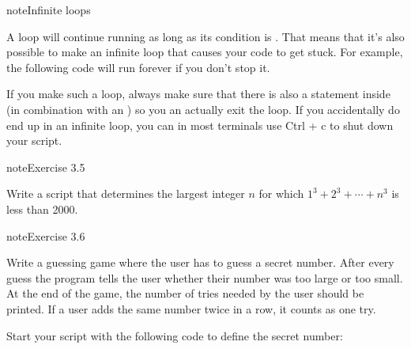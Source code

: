 \documentclass[letterpaper,10pt,english]{jupyterBook}
\begin{document}
\begin{sphinxadmonition}{note}{Infinite loops}

\sphinxAtStartPar
A  loop will continue running as long as its condition is . That means that it’s also possible to make an infinite loop that causes your code to get stuck. For example, the following code will run forever if you don’t stop it.

\begin{sphinxVerbatim}[commandchars=\\\{\}]
 
\end{sphinxVerbatim}

\sphinxAtStartPar
If you make such a loop, always make sure that there is also a  statement inside (in combination with an ) so you an actually exit the loop. If you accidentally do end up in an infinite loop, you can in most terminals use Ctrl + c to shut down your script.
\end{sphinxadmonition}

\begin{sphinxadmonition}{note}{Exercise 3.5}

\sphinxAtStartPar
Write a script that determines the largest integer \(n\) for which \(1^3 + 2^3 + \cdots + n^3\) is less than 2000.
\end{sphinxadmonition}

\begin{sphinxadmonition}{note}{Exercise 3.6}

\sphinxAtStartPar
Write a guessing game where the user has to guess a secret number. After every guess the program tells the user whether their number was too large or too small. At the end of the game, the number of tries needed by the user should be printed. If a user adds the same number twice in a row, it counts as one try.

\sphinxAtStartPar
Start your script with the following code to define the secret number:

\begin{sphinxVerbatim}[commandchars=\\\{\}]
 

   

\end{sphinxVerbatim}
\end{sphinxadmonition}
\end{document}
